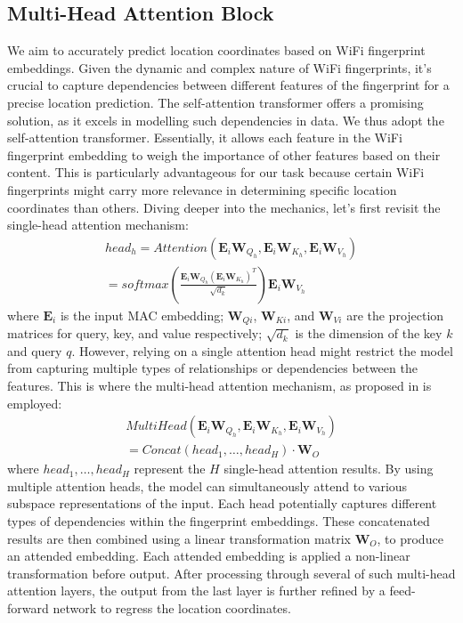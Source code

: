 \subsection{Multi-Head Attention Block}
\label{sub:multi_head_attention}
We aim to accurately predict location coordinates based on WiFi fingerprint embeddings. Given the dynamic and complex nature of WiFi fingerprints, it's crucial to capture dependencies between different features of the fingerprint for a precise location prediction. The self-attention transformer offers a promising solution, as it excels in modelling such dependencies in data. 
We thus adopt the self-attention transformer. Essentially, it allows each feature in the WiFi fingerprint embedding to weigh the importance of other features based on their content. This is particularly advantageous for our task because certain WiFi fingerprints might carry more relevance in determining specific location coordinates than others. Diving deeper into the mechanics, let's first revisit the single-head attention mechanism:
\begin{equation}
\begin{aligned}
head_h = Attention(\mathbf{E}_i \mathbf{W}_{Q_h}, \mathbf{E}_i \mathbf{W}_{K_h}, \mathbf{E}_i \mathbf{W}_{V_h}) \\
= softmax\left(\frac{\mathbf{E}_i \mathbf{W}_{Q_h}(\mathbf{E}_i \mathbf{W}_{K_h})^T}{\sqrt{d_k}}\right)\mathbf{E}_i \mathbf{W}_{V_h}
\end{aligned}
\end{equation}
where $\mathbf{E}_i$ is the input MAC embedding; $\mathbf{W}_{Qi}$, $\mathbf{W}_{Ki}$, and $\mathbf{W}_{Vi}$ are the projection matrices for query, key, and value respectively; $\sqrt{d_k}$ is the dimension of the key $k$ and query $q$.
However, relying on a single attention head might restrict the model from capturing multiple types of relationships or dependencies between the features. This is where the multi-head attention mechanism, as proposed in \cite{vaswani2017attention} is employed:
\begin{equation}
\begin{aligned}
MultiHead(\mathbf{E}_i \mathbf{W}_{Q_h}, \mathbf{E}_i \mathbf{W}_{K_h}, \mathbf{E}_i \mathbf{W}_{V_h})\\=Concat(head_1, \ldots, head_H) \cdot \mathbf{W}_O
\end{aligned}
\end{equation}
where $head_1, \ldots, head_H$ represent the $H$ single-head attention results. By using multiple attention heads, the model can simultaneously attend to various subspace representations of the input. Each head potentially captures different types of dependencies within the fingerprint embeddings. 
These concatenated results are then combined using a linear transformation matrix $\mathbf{W}_O$, to produce an attended embedding. Each attended embedding is applied a non-linear transformation before output. After processing through several of such multi-head attention layers, the output from the last layer is further refined by a feed-forward network to regress the location coordinates.


